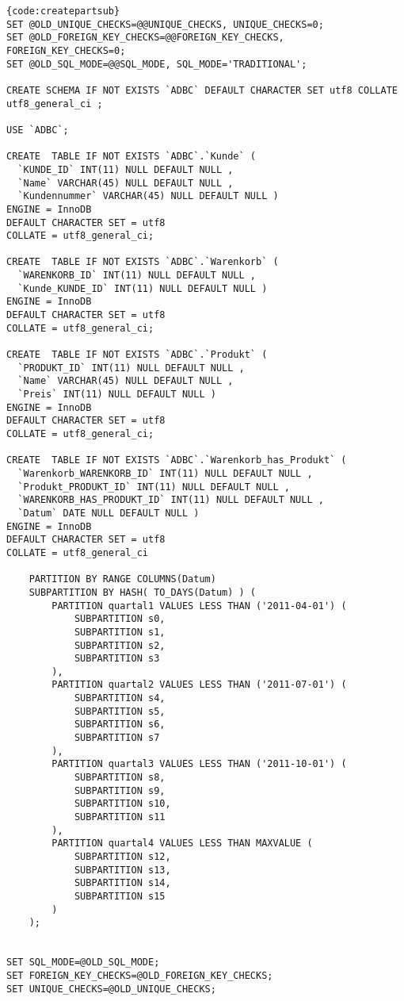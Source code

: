 \begin{lstlisting}[caption=Tabellenerzeugung mit Sub-Partitioning, firstnumber=1]{code:createpartsub}
SET @OLD_UNIQUE_CHECKS=@@UNIQUE_CHECKS, UNIQUE_CHECKS=0;
SET @OLD_FOREIGN_KEY_CHECKS=@@FOREIGN_KEY_CHECKS, FOREIGN_KEY_CHECKS=0;
SET @OLD_SQL_MODE=@@SQL_MODE, SQL_MODE='TRADITIONAL';

CREATE SCHEMA IF NOT EXISTS `ADBC` DEFAULT CHARACTER SET utf8 COLLATE utf8_general_ci ;

USE `ADBC`;

CREATE  TABLE IF NOT EXISTS `ADBC`.`Kunde` (
  `KUNDE_ID` INT(11) NULL DEFAULT NULL ,
  `Name` VARCHAR(45) NULL DEFAULT NULL ,
  `Kundennummer` VARCHAR(45) NULL DEFAULT NULL )
ENGINE = InnoDB
DEFAULT CHARACTER SET = utf8
COLLATE = utf8_general_ci;

CREATE  TABLE IF NOT EXISTS `ADBC`.`Warenkorb` (
  `WARENKORB_ID` INT(11) NULL DEFAULT NULL ,
  `Kunde_KUNDE_ID` INT(11) NULL DEFAULT NULL )
ENGINE = InnoDB
DEFAULT CHARACTER SET = utf8
COLLATE = utf8_general_ci;

CREATE  TABLE IF NOT EXISTS `ADBC`.`Produkt` (
  `PRODUKT_ID` INT(11) NULL DEFAULT NULL ,
  `Name` VARCHAR(45) NULL DEFAULT NULL ,
  `Preis` INT(11) NULL DEFAULT NULL )
ENGINE = InnoDB
DEFAULT CHARACTER SET = utf8
COLLATE = utf8_general_ci;

CREATE  TABLE IF NOT EXISTS `ADBC`.`Warenkorb_has_Produkt` (
  `Warenkorb_WARENKORB_ID` INT(11) NULL DEFAULT NULL ,
  `Produkt_PRODUKT_ID` INT(11) NULL DEFAULT NULL ,
  `WARENKORB_HAS_PRODUKT_ID` INT(11) NULL DEFAULT NULL ,
  `Datum` DATE NULL DEFAULT NULL )
ENGINE = InnoDB
DEFAULT CHARACTER SET = utf8
COLLATE = utf8_general_ci

    PARTITION BY RANGE COLUMNS(Datum)
    SUBPARTITION BY HASH( TO_DAYS(Datum) ) (
        PARTITION quartal1 VALUES LESS THAN ('2011-04-01') (
            SUBPARTITION s0,
            SUBPARTITION s1,
            SUBPARTITION s2,
            SUBPARTITION s3
        ),
        PARTITION quartal2 VALUES LESS THAN ('2011-07-01') (
            SUBPARTITION s4,
            SUBPARTITION s5,
            SUBPARTITION s6,
            SUBPARTITION s7
        ),
        PARTITION quartal3 VALUES LESS THAN ('2011-10-01') (
            SUBPARTITION s8,
            SUBPARTITION s9,
            SUBPARTITION s10,
            SUBPARTITION s11
        ),
        PARTITION quartal4 VALUES LESS THAN MAXVALUE (
            SUBPARTITION s12,
            SUBPARTITION s13,
            SUBPARTITION s14,
            SUBPARTITION s15
        )
    );


SET SQL_MODE=@OLD_SQL_MODE;
SET FOREIGN_KEY_CHECKS=@OLD_FOREIGN_KEY_CHECKS;
SET UNIQUE_CHECKS=@OLD_UNIQUE_CHECKS;
\end{lstlisting}


